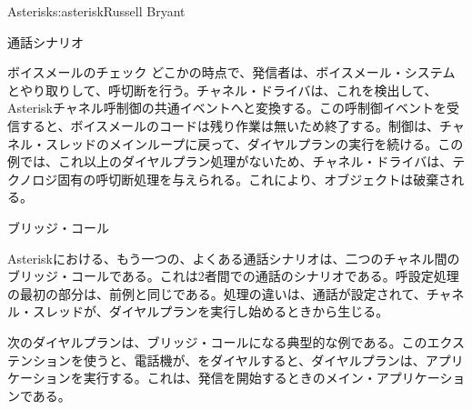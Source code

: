 \begin{aosachapter}{Asterisk}{s:asterisk}{Russell Bryant}
\begin{aosasect1}{通話シナリオ}
\begin{aosasect2}{ボイスメールのチェック}
どこかの時点で、発信者は、ボイスメール・システムとやり取りして、呼切断を行う。チャネル・ドライバは、これを検出して、Asteriskチャネル呼制御の共通イベントへと変換する。この呼制御イベントを受信すると、ボイスメールのコードは残り作業は無いため終了する。制御は、チャネル・スレッドのメインループに戻って、ダイヤルプランの実行を続ける。この例では、これ以上のダイヤルプラン処理がないため、チャネル・ドライバは、テクノロジ固有の呼切断処理を与えられる。これにより、オブジェクトは破棄される。

\end{aosasect2}

\begin{aosasect2}{ブリッジ・コール}

Asteriskにおける、もう一つの、よくある通話シナリオは、二つのチャネル間のブリッジ・コールである。これは2者間での通話のシナリオである。呼設定処理の最初の部分は、前例と同じである。処理の違いは、通話が設定されて、チャネル・スレッドが、ダイヤルプランを実行し始めるときから生じる。

次のダイヤルプランは、ブリッジ・コールになる典型的な例である。このエクステンションを使うと、電話機が、をダイヤルすると、ダイヤルプランは、アプリケーションを実行する。これは、発信を開始するときのメイン・アプリケーションである。


\end{aosasect2}
\end{aosasect1}
\end{aosachapter}
